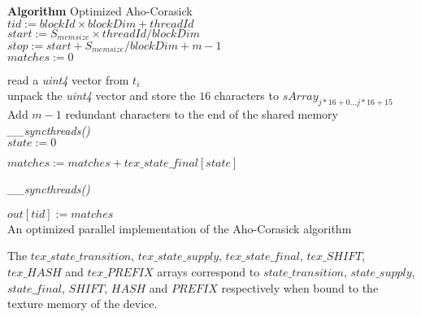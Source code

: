 \documentclass{ws-ijait}
\begin{document}
\begin{algorithm}[h]

\textbf{Algorithm} Optimized Aho-Corasick\\

$tid := blockId \times blockDim + threadId$\\
$start := S_{memsize} \times threadId / blockDim$\\
$stop := start + S_{memsize} / blockDim + m - 1$\\
$matches := 0$\\


 {

	 {
		 {
			read a \textit{uint4} vector from $t_{i}$\\
			unpack the \textit{uint4} vector and store the $16$ characters to $sArray_{j * 16 + 0 \ldots j * 16 + 15}$\\
		}
	}
	Add $m - 1$ redundant characters to the end of the shared memory\\
	\textit{\_\_syncthreads()}\\
		
	$state := 0$\\
	
	 {
		
	
			$matches := matches + tex\_state\_final[state]$\\
	}
	
	\textit{\_\_syncthreads()}\\
}
$out[tid] := matches$\\

\caption{An optimized parallel implementation of the Aho-Corasick algorithm}
\label{compl:cuda_AC_optimized_implementation}
\end{algorithm}

The $tex\_state\_transition$, $tex\_state\_supply$, $tex\_state\_final$, $tex\_SHIFT$, $tex\_HASH$ and $tex\_PREFIX$ arrays correspond to $state\_transition$, $state\_supply$, $state\_final$, $SHIFT$, $HASH$ and $PREFIX$ respectively when bound to the texture memory of the device. \\
\end{document}

